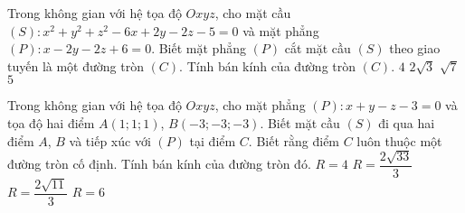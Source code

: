 \begin{ex}%
	Trong không gian với hệ tọa độ $Oxyz$, cho mặt cầu $(S)\colon x^2+y^2+z^2-6x+2y-2z-5=0$ và mặt phẳng $(P)\colon x-2y-2z+6=0$. Biết mặt phẳng $(P)$ cắt mặt cầu $(S)$ theo giao tuyến là một đường tròn $(C)$. Tính bán kính của đường tròn $(C)$.
	\choice
	{$4$}
	{$2\sqrt{3}$}
	{\True $\sqrt{7}$}
	{$5$}
\end{ex}
\begin{ex}%
	Trong không gian với hệ tọa độ $Oxyz$, cho mặt phẳng $(P)\colon x+y-z-3=0$ và tọa độ hai điểm $A(1;1;1)$, $B(-3;-3;-3)$. Biết mặt cầu $(S)$ đi qua hai điểm $A$, $B$ và tiếp xúc với $(P)$ tại điểm $C$. Biết rằng điểm $C$ luôn thuộc một đường tròn cố định. Tính bán kính của đường tròn đó.
	\choice
	{$R=4$}
	{$R=\dfrac{2\sqrt{33}}{3}$}
	{$R=\dfrac{2\sqrt{11}}{3}$}
	{\True $R=6$}
\end{ex}
